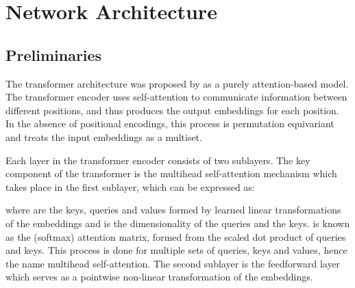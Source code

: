 \documentclass[sigconf,authorversion]{acmart}
\begin{document}
\section{Network Architecture}
\subsection{Preliminaries}
The transformer architecture was proposed by \citet{vaswani2017attention} as a purely attention-based model. The transformer encoder uses self-attention to communicate information between different positions, and thus produces the output embeddings for each position. In the absence of positional encodings, this process is permutation equivariant and treats the input embeddings as a multiset.

Each layer in the transformer encoder consists of two sublayers. The key component of the transformer is the multihead self-attention mechanism which takes place in the first sublayer, which can be expressed as:


where  are the keys, queries and values formed by learned linear transformations of the embeddings and  is the dimensionality of the queries and the keys.  is known as the (softmax) attention matrix, formed from the scaled dot product of queries and keys. This process is done for multiple sets of queries, keys and values, hence the name multihead self-attention. The second sublayer is the feedforward layer which serves as a pointwise non-linear transformation of the embeddings.
\end{document}
